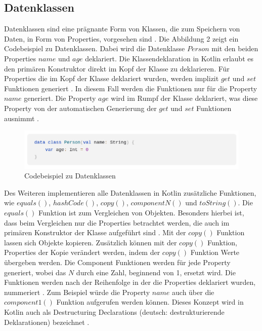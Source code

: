 \documentclass{article}
\begin{document}
\subsection{Datenklassen}
Datenklassen sind eine prägnante Form von Klassen, die zum Speichern von Daten, in Form von Properties, vorgesehen sind \cite{KotlinLangDoc}. Die Abbildung 2 zeigt ein Codebeispiel zu Datenklassen. Dabei wird die Datenklasse $Person$ mit den beiden Properties $name$ und $age$ deklariert. Die Klassendeklaration in Kotlin erlaubt es den primären Konstruktor direkt im Kopf der Klasse zu deklarieren. Für Properties die im Kopf der Klasse deklariert wurden, werden implizit $get$ und $set$ Funktionen generiert \cite{KotlinLangDoc}. In diesem Fall werden die Funktionen nur für die Property $name$ generiert. Die Property $age$ wird im Rumpf der Klasse deklariert, was diese Property von der automatischen Generierung der $get$ und $set$ Funktionen ausnimmt \cite{KotlinLangDoc}.
\begin{figure}[!htb]
    \centering
    \includegraphics[width=\linewidth]{img/Dataclass.png}
    \caption{Codebeispiel zu Datenklassen\footnotemark}
\end{figure}
\newline
Des Weiteren implementieren alle Datenklassen in Kotlin zusätzliche Funktionen, wie $equals()$, $hashCode()$, $copy()$, $componentN()$ und $toString()$. Die $equals()$ Funktion ist zum Vergleichen von Objekten. Besonders hierbei ist, dass beim Vergleichen nur die Properties betrachtet werden, die auch im primären Konstruktor der Klasse aufgeführt sind \cite{KotlinLangDoc}. Mit der $copy()$ Funktion lassen sich Objekte kopieren. Zusätzlich können mit der $copy()$ Funktion, Properties der Kopie verändert werden, indem der $copy()$ Funktion Werte übergeben werden. Die Component Funktionen werden für jede Property generiert, wobei das $N$ durch eine Zahl, beginnend von 1, ersetzt wird. Die Funktionen werden nach der Reihenfolge in der die Properties deklariert wurden, nummeriert \cite{KotlinLangDoc}. Zum Beispiel würde die Property $name$ auch über die $component1()$ Funktion aufgerufen werden können. Dieses Konzept wird in Kotlin auch als Destructuring Declarations (deutsch: destrukturierende Deklarationen) bezeichnet \cite{KotlinLangDoc}.
\end{document}
